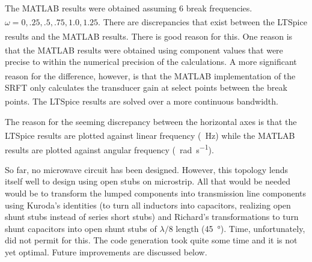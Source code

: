 The MATLAB\textsuperscript{\textregistered} results were obtained assuming 6
break frequencies. $\omega = 0,.25,.5,.75,1.0,1.25$. There are discrepancies
that exist between the LTSpice\textsuperscript{\textregistered} results and the
MATLAB\textsuperscript{\textregistered} results. There is good reason for this.
One reason is that the MATLAB\textsuperscript{\textregistered} results were
obtained using component values that were precise to within the numerical precision of
the calculations. A more significant reason for the difference, however, is that
the MATLAB\textsuperscript{\textregistered} implementation of the SRFT only
calculates the transducer gain at select points between the break points. The
LTSpice\textsuperscript{\textregistered} results are solved over a more
continuous bandwidth. 

The reason for the seeming discrepancy between the horizontal axes is that the
LTSpice\textsuperscript{\textregistered} results are plotted against linear
frequency (\SI{}{\hertz}) while the MATLAB\textsuperscript{\textregistered}
results are plotted against angular frequency (\SI{}{\radian\per\second}).

So far, no microwave circuit has been designed. However, this topology lends
itself well to design using open stubs on microstrip. All that would be needed
would be to transform the lumped components into transmission line components
using Kuroda's identities (to turn all inductors into capacitors, realizing open
shunt stubs instead of series short stubs) and Richard's transformations to turn
shunt capacitors into open shunt stubs of $\lambda/8$ length (\SI{45}{\degree}).
Time, unfortunately, did not permit for this. The code generation took quite
some time and it is not yet optimal. Future improvements are discussed below.

